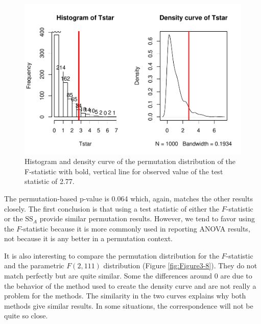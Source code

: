\documentclass[]{book}
\theoremstyle{definition}
\theoremstyle{definition}
\theoremstyle{remark}
\begin{document}
\begin{figure}
\centering
\includegraphics{03-oneWayAnova_files/figure-latex/Figure3-7-1.pdf}
\caption{\label{fig:Figure3-7}Histogram and density curve of the permutation distribution
of the F-statistic with bold, vertical line for observed value of the
test statistic of 2.77.}
\end{figure}

The permutation-based p-value is 0.064 which, again, matches the other
results closely. The first conclusion is that using a test statistic of
either the \(F\)-statistic or the \(\text{SS}_A\) provide similar
permutation results. However, we tend to favor using the \(F\)-statistic
because it is more commonly used in reporting ANOVA results, not because
it is any better in a permutation context.

It is also interesting to compare the permutation distribution for the
\(F\)-statistic and the parametric \(F(2, 111)\) distribution (Figure
\ref{fig:Figure3-8}). They do not match perfectly but are quite similar.
Some the differences around 0 are due to the behavior of the method used
to create the density curve and are not really a problem for the
methods. The similarity in the two curves explains why both methods give
similar results. In some situations, the correspondence will not be
quite so close.
\end{document}
